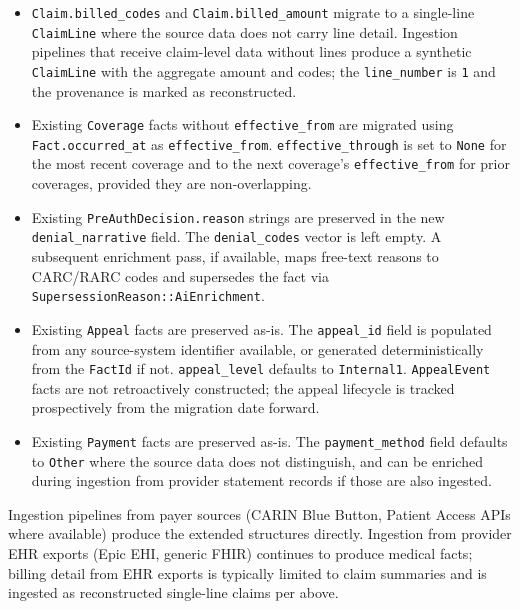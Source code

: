 \documentclass[11pt]{article}
\begin{document}
\begin{itemize}

\item \texttt{Claim.billed\_codes} and \texttt{Claim.billed\_amount}
migrate to a single-line \texttt{ClaimLine} where the source data does
not carry line detail. Ingestion pipelines that receive claim-level data
without lines produce a synthetic \texttt{ClaimLine} with the aggregate
amount and codes; the \texttt{line\_number} is \texttt{1} and the
provenance is marked as reconstructed.

\item Existing \texttt{Coverage} facts without \texttt{effective\_from}
are migrated using \texttt{Fact.occurred\_at} as
\texttt{effective\_from}. \texttt{effective\_through} is set to
\texttt{None} for the most recent coverage and to the next coverage's
\texttt{effective\_from} for prior coverages, provided they are
non-overlapping.

\item Existing \texttt{PreAuthDecision.reason} strings are preserved in
the new \texttt{denial\_narrative} field. The
\texttt{denial\_codes} vector is left empty. A subsequent enrichment
pass, if available, maps free-text reasons to CARC/RARC codes and
supersedes the fact via \texttt{SupersessionReason::AiEnrichment}.

\item Existing \texttt{Appeal} facts are preserved as-is. The
\texttt{appeal\_id} field is populated from any source-system
identifier available, or generated deterministically from the
\texttt{FactId} if not. \texttt{appeal\_level} defaults to
\texttt{Internal1}. \texttt{AppealEvent} facts are not
retroactively constructed; the appeal lifecycle is tracked
prospectively from the migration date forward.

\item Existing \texttt{Payment} facts are preserved as-is. The
\texttt{payment\_method} field defaults to \texttt{Other} where the
source data does not distinguish, and can be enriched during ingestion
from provider statement records if those are also ingested.

\end{itemize}

Ingestion pipelines from payer sources (CARIN Blue Button, Patient
Access APIs where available) produce the extended structures directly.
Ingestion from provider EHR exports (Epic EHI, generic FHIR) continues
to produce medical facts; billing detail from EHR exports is typically
limited to claim summaries and is ingested as reconstructed
single-line claims per above.
\end{document}
